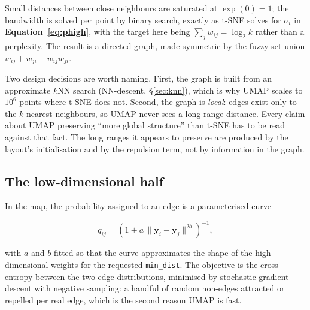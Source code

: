 Small distances between close neighbours are saturated at $\exp(0)=1$; the
bandwidth is solved per point by binary search, exactly as t-SNE solves for
$\sigma_i$ in \textbf{Equation~\ref{eq:phigh}}, with the target here being
$\sum_j w_{ij} = \log_2 k$ rather than a perplexity. The result is a directed
graph, made symmetric by the fuzzy-set union
$w_{ij} + w_{ji} - w_{ij}w_{ji}$.

Two design decisions are worth naming. First, the graph is built from an
approximate $k$NN search (NN-descent, \S\ref{sec:knn}), which is why UMAP
scales to $10^6$ points where t-SNE does not. Second, the graph is
\emph{local}: edges exist only to the $k$ nearest neighbours, so UMAP never
sees a long-range distance. Every claim about UMAP preserving ``more global
structure'' than t-SNE has to be read against that fact. The long ranges it
appears to preserve are produced by the layout's initialisation and by the
repulsion term, not by information in the graph.

\subsection{The low-dimensional half}

In the map, the probability assigned to an edge is a parameterised curve

\begin{equation}
q_{ij} = \left(1 + a\,\|\mathbf{y}_i - \mathbf{y}_j\|^{2b}\right)^{-1},
\label{eq:umapq}
\end{equation}

with $a$ and $b$ fitted so that the curve approximates the shape of the
high-dimensional weights for the requested \texttt{min\_dist}. The objective is
the cross-entropy between the two edge distributions, minimised by stochastic
gradient descent with negative sampling: a handful of random non-edges
attracted or repelled per real edge, which is the second reason UMAP is fast.

\begin{marginnote}[]
\end{marginnote}


